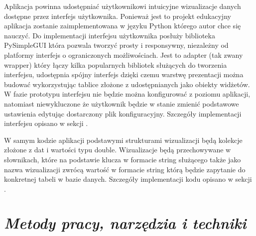 \documentclass[a4paper,10pt, twoside]{report}
\newcommand{\customstylechapter}[1]{\large{\textit{#1}}}
\begin{document}
{Aplikacja powinna udostępniać użytkownikowi intuicyjne wizualizacje danych 
dostępne przez interfejs użytkownika. Ponieważ jest to projekt edukacyjny 
aplikacja zostanie zaimplementowana w języku Python \cite{Python} którego autor 
chce się nauczyć. Do implementacji interfejsu użytkownika posłuży biblioteka 
PySimpleGUI \cite{PySimpleGUI} która pozwala tworzyć prosty i responsywny, 
niezależny od platformy interfejs o ograniczonych możliwościach. Jest to adapter
 (tak zwany wrapper) który łączy kilka popularnych bibliotek służących do 
tworzenia interfejsu, udostępnia spójny interfejs dzięki czemu warstwę 
prezentacji można budować wykorzystując tablice złożone z udostępnianych jako 
obiekty widżetów. W fazie prototypu interfejsu nie będzie można konfigurować z 
poziomu aplikacji, natomiast niewykluczone że użytkownik będzie w stanie zmienić
 podstawowe ustawienia edytując dostarczony plik konfiguracyjny. Szczegóły 
implementacji interfejsu opisano w sekcji 
.}

{W samym kodzie aplikacji podstawymi strukturami wizualizacji będą kolekcje 
złożone z dat i wartości typu double. Wizualizacje będą przechowywane w 
słownikach, które na podstawie klucza w formacie string służącego także jako 
nazwa wizualizacji zwrócą wartość w formacie string którą będzie zapytanie do 
konkretnej tabeli w bazie danych. Szczegóły implementacji kodu opisano w sekcji 
.}


\chapter{\customstylechapter{Metody pracy, narzędzia i techniki}}
\end{document}
